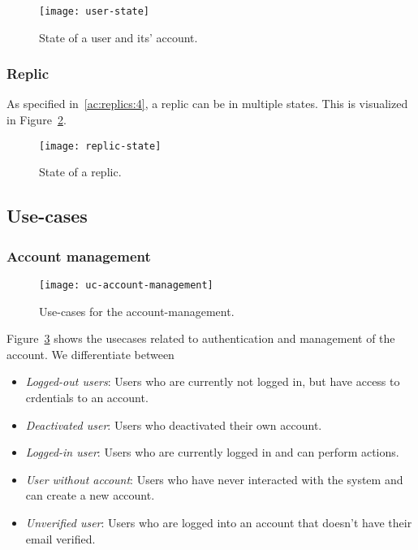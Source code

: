 \begin{figure}
    \centering
    \texttt{[image: user-state]}
    \caption{State of a user and its' account.}
    \label{fig:user-state}
\end{figure}

\subsubsection{Replic}
As specified in~\ref{ac:replics:4}, a replic can be in multiple states.
This is visualized in Figure~\ref{fig:replic-state}.

\begin{figure}
    \centering
    \texttt{[image: replic-state]}
    \caption{State of a replic.}
    \label{fig:replic-state}
\end{figure}

\subsection{Use-cases}\label{subsec:use-cases}

\subsubsection{Account management}
\begin{figure}
    \centering
    \texttt{[image: uc-account-management]}
    \caption{Use-cases for the account-management.}
    \label{fig:account-management}
\end{figure}

Figure~\ref{fig:account-management} shows the usecases related to authentication and management of the account.
We differentiate between
\begin{itemize}
    \item \textit{Logged-out users}: Users who are currently not logged in, but have access to crdentials to an account.
    \item \textit{Deactivated user}: Users who deactivated their own account.
    \item \textit{Logged-in user}: Users who are currently logged in and can perform actions.
    \item \textit{User without account}: Users who have never interacted with the system and can create a new account.
    \item \textit{Unverified user}: Users who are logged into an account that doesn't have their email verified.
\end{itemize}

